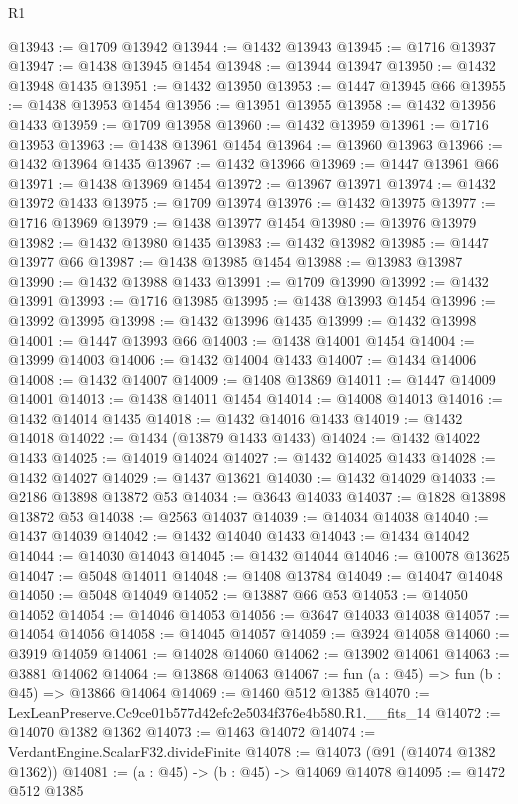\begin{lexlean}{R1}
\begin{coremodule}
@13943 := @1709 @13942
@13944 := @1432 @13943
@13945 := @1716 @13937
@13947 := @1438 @13945 @1454
@13948 := @13944 @13947
@13950 := @1432 @13948 @1435
@13951 := @1432 @13950
@13953 := @1447 @13945 @66
@13955 := @1438 @13953 @1454
@13956 := @13951 @13955
@13958 := @1432 @13956 @1433
@13959 := @1709 @13958
@13960 := @1432 @13959
@13961 := @1716 @13953
@13963 := @1438 @13961 @1454
@13964 := @13960 @13963
@13966 := @1432 @13964 @1435
@13967 := @1432 @13966
@13969 := @1447 @13961 @66
@13971 := @1438 @13969 @1454
@13972 := @13967 @13971
@13974 := @1432 @13972 @1433
@13975 := @1709 @13974
@13976 := @1432 @13975
@13977 := @1716 @13969
@13979 := @1438 @13977 @1454
@13980 := @13976 @13979
@13982 := @1432 @13980 @1435
@13983 := @1432 @13982
@13985 := @1447 @13977 @66
@13987 := @1438 @13985 @1454
@13988 := @13983 @13987
@13990 := @1432 @13988 @1433
@13991 := @1709 @13990
@13992 := @1432 @13991
@13993 := @1716 @13985
@13995 := @1438 @13993 @1454
@13996 := @13992 @13995
@13998 := @1432 @13996 @1435
@13999 := @1432 @13998
@14001 := @1447 @13993 @66
@14003 := @1438 @14001 @1454
@14004 := @13999 @14003
@14006 := @1432 @14004 @1433
@14007 := @1434 @14006
@14008 := @1432 @14007
@14009 := @1408 @13869
@14011 := @1447 @14009 @14001
@14013 := @1438 @14011 @1454
@14014 := @14008 @14013
@14016 := @1432 @14014 @1435
@14018 := @1432 @14016 @1433
@14019 := @1432 @14018
@14022 := @1434 (@13879 @1433 @1433)
@14024 := @1432 @14022 @1433
@14025 := @14019 @14024
@14027 := @1432 @14025 @1433
@14028 := @1432 @14027
@14029 := @1437 @13621
@14030 := @1432 @14029
@14033 := @2186 @13898 @13872 @53
@14034 := @3643 @14033
@14037 := @1828 @13898 @13872 @53
@14038 := @2563 @14037
@14039 := @14034 @14038
@14040 := @1437 @14039
@14042 := @1432 @14040 @1433
@14043 := @1434 @14042
@14044 := @14030 @14043
@14045 := @1432 @14044
@14046 := @10078 @13625
@14047 := @5048 @14011
@14048 := @1408 @13784
@14049 := @14047 @14048
@14050 := @5048 @14049
@14052 := @13887 @66 @53
@14053 := @14050 @14052
@14054 := @14046 @14053
@14056 := @3647 @14033 @14038
@14057 := @14054 @14056
@14058 := @14045 @14057
@14059 := @3924 @14058
@14060 := @3919 @14059
@14061 := @14028 @14060
@14062 := @13902 @14061
@14063 := @3881 @14062
@14064 := @13868 @14063
@14067 := fun (a : @45) => fun (b : @45) => @13866 @14064
@14069 := @1460 @512 @1385
@14070 := LexLeanPreserve.Cc9ce01b577d42efc2e5034f376e4b580.R1.__fits_14
@14072 := @14070 @1382 @1362
@14073 := @1463 @14072
@14074 := VerdantEngine.ScalarF32.divideFinite
@14078 := @14073 (@91 (@14074 @1382 @1362))
@14081 := (a : @45) -> (b : @45) -> @14069 @14078
@14095 := @1472
    @512
    @1385

\end{coremodule}
\end{lexlean}
